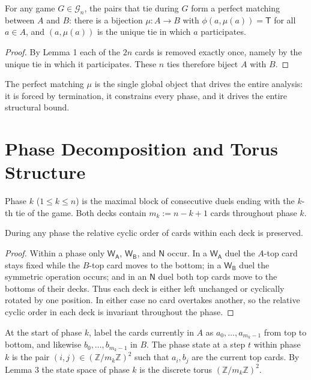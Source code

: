 \documentclass[12pt]{article}
\newcommand{\WA}{\mathsf{W_A}}
\newcommand{\WB}{\mathsf{W_B}}
\newcommand{\TT}{\mathsf{T}}
\newcommand{\NN}{\mathsf{N}}
\begin{document}
\begin{lemma}
For any game $G\in\mathcal{G}_n$, the pairs that tie during $G$ form a perfect matching between $A$ and $B$: there is a bijection $\mu:A\rightarrow B$ with $\phi(a,\mu(a))=\TT$ for all $a\in A$, and $(a,\mu(a))$ is the unique tie in which $a$ participates.
\end{lemma}
\begin{proof}
By Lemma 1 each of the $2n$ cards is removed exactly once, namely by the unique tie in which it participates. These $n$ ties therefore biject $A$ with $B$.
\end{proof}

The perfect matching $\mu$ is the single global object that drives the entire analysis: it is forced by termination, it constrains every phase, and it drives the entire structural bound.

\section{Phase Decomposition and Torus Structure}\label{sec:phase}
\begin{definition}[Phase] Phase $k$ ($1\le k\le n$) is the maximal block of consecutive duels ending with the $k$-th tie of the game. Both decks contain $m_k:=n-k+1$ cards throughout phase $k$.
\end{definition}

\begin{lemma} During any phase the relative cyclic order of cards within each deck is preserved.
\end{lemma}
\begin{proof}
Within a phase only $\WA$, $\WB$, and $\NN$ occur. In a $\WA$ duel the $A$-top card stays fixed while the $B$-top card moves to the bottom; in a $\WB$ duel the symmetric operation occurs; and in an $\NN$ duel both top cards move to the bottoms of their decks. Thus each deck is either left unchanged or cyclically rotated by one position. In either case no card overtakes another, so the relative cyclic order in each deck is invariant throughout the phase.
\end{proof}

\begin{definition} At the start of phase $k$, label the cards currently in $A$ as $a_0,\dots,a_{m_k-1}$ from top to bottom, and likewise $b_0,\dots,b_{m_k-1}$ in $B$. The phase state at a step $t$ within phase $k$ is the pair $(i,j)\in(\mathbb{Z}/m_k\mathbb{Z})^2$ such that $a_i, b_j$ are the current top cards. By Lemma 3 the state space of phase $k$ is the discrete torus $(\mathbb{Z}/m_k\mathbb{Z})^2$.
\end{definition}
\end{document}
